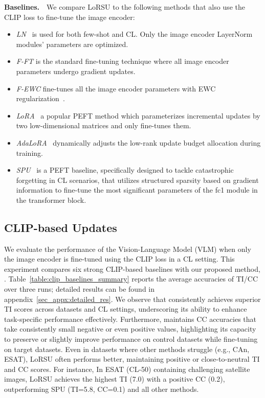 \textbf{Baselines.}~~We compare LoRSU to the following methods that also use the CLIP loss to fine-tune the image encoder:
\begin{itemize}[noitemsep,topsep=1pt,parsep=1pt,partopsep=1pt,leftmargin=*]
    \item \emph{LN}~\cite{perez2018film,panos2023first} is used for both few-shot and CL. Only the  image encoder LayerNorm modules' parameters are optimized.
    \item \emph{F-FT} is the standard fine-tuning technique where all image encoder parameters undergo gradient updates.
    \item \emph{F-EWC} fine-tunes all the image encoder parameters with EWC regularization~\cite{kirkpatrick2017overcoming}.%
    \item \emph{LoRA}~\cite{hu2021lora} a popular PEFT method which parameterizes incremental updates by two low-dimensional matrices and only fine-tunes them.
    \item \emph{AdaLoRA}~\cite{zhang2023adalora} dynamically adjusts the low-rank update budget allocation during training.
    \item \emph{SPU}~\cite{zhang2024overcoming} is a PEFT baseline, specifically designed to tackle catastrophic forgetting in CL scenarios, that utilizes structured sparsity based on gradient information to fine-tune the most significant parameters of the fc1 module in the transformer block. 
\end{itemize}

\subsection{CLIP-based Updates}

We evaluate the performance of the Vision-Language Model (VLM) when only the image encoder is fine-tuned using the CLIP loss in a CL setting. This experiment compares six strong CLIP-based baselines with our proposed method, \ours. Table~\ref{table:clip_baselines_summary} reports the average accuracies of TI/CC over three runs; detailed results can be found in appendix~\ref{sec_appx:detailed_res}. We observe that \ours consistently achieves superior TI scores across datasets and CL settings, underscoring its ability to enhance task-specific performance effectively. Furthermore, \ours maintains CC accuracies that take consistently small negative or even positive values, highlighting its capacity to preserve or slightly improve performance on control datasets while fine-tuning on target datasets. Even in datasets where other methods struggle (e.g., CAn, ESAT), LoRSU often performs better, maintaining positive or close-to-neutral TI and CC scores. For instance, In ESAT (CL-50) containing challenging satellite images, LoRSU achieves the highest TI (7.0) with a positive CC (0.2), outperforming SPU (TI=5.8, CC=0.1) and all other methods. 

